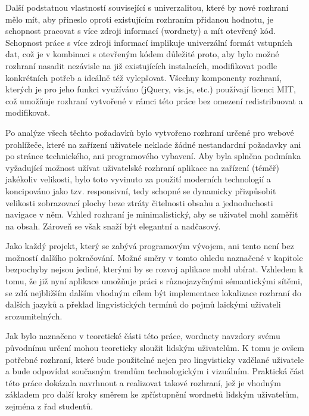 \documentclass[a4paper, 11pt, oneside]{book}
\newcommand{\itNameRef}[1]{\textit{\nameref{#1}}}
\begin{document}
			Další podstatnou vlastností související s univerzalitou, které by nové rozhraní mělo mít, aby přineslo oproti existujícím rozhraním přidanou hodnotu, je schopnost pracovat s více zdroji informací (wordnety) a mít otevřený kód. Schopnost práce s více zdroji informací implikuje univerzální formát vstupních dat, což je v kombinaci s otevřeným kódem důležité proto, aby bylo možné rozhraní nasadit nezávisle na již existujících instalacích, modifikovat podle konkrétních potřeb a ideálně též vylepšovat. Všechny komponenty rozhraní, kterých je pro jeho funkci využíváno (jQuery, vis.js, etc.) používají licenci MIT, což umožňuje rozhraní vytvořené v rámci této práce bez omezení redistribuovat a modifikovat. 

			Po analýze všech těchto požadavků bylo vytvořeno rozhraní určené pro webové prohlížeče, které na zařízení uživatele neklade žádné nestandardní požadavky ani po stránce technického, ani programového vybavení. Aby byla splněna podmínka vyžadující možnost užívat uživatelské rozhraní aplikace na zařízení (téměř) jakékoliv velikosti, bylo toto vyvinuto za použití moderních technologií a koncipováno jako tzv. responsivní, tedy schopné se dynamicky přizpůsobit velikosti zobrazovací plochy beze ztráty čitelnosti obsahu a jednoduchosti navigace v něm. Vzhled rozhraní je minimalistický, aby se uživatel mohl zaměřit na obsah. Zároveň se však snaží být elegantní a nadčasový.

			Jako každý projekt, který se zabývá programovým vývojem, ani tento není bez možností dalšího pokračování. Možné směry v tomto ohledu naznačené v kapitole \itNameRef{cha:co-se-nestihlo} bezpochyby nejsou jediné, kterými by se rozvoj aplikace mohl ubírat. Vzhledem k tomu, že již nyní aplikace umožňuje práci s různojazyčnými sémantickými sítěmi, se zdá nejbližším dalším vhodným cílem být implementace lokalizace rozhraní do dalších jazyků a překlad lingvistických termínů do pojmů laickými uživateli srozumitelných.

			Jak bylo naznačeno v teoretické části této práce, wordnety navzdory svému původnímu určení mohou teoreticky sloužit lidským uživatelům. K tomu je ovšem potřebné rozhraní, které bude použitelné nejen pro lingvisticky vzdělané uživatele a bude odpovídat současným trendům technologickým i vizuálním. Praktická část této práce dokázala navrhnout a realizovat takové rozhraní, jež je vhodným základem pro další kroky směrem ke zpřístupnění wordnetů lidským uživatelům, zejména z řad studentů.
\end{document}
